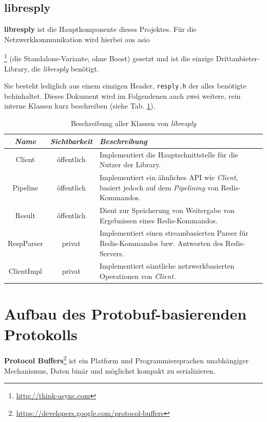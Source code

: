 \documentclass[a4paper,ngerman]{article}
\begin{document}
\subsection{libresply}
\textbf{libresply} ist die Hauptkomponente dieses Projektes.
Für die Netzwerkkommunikation wird hierbei aus asio{\footnote{\url{http://think-async.com}} (die Standalone-Variante, ohne Boost) gesetzt und ist die einzige Drittanbieter-Library, die \textit{libresply} benötigt.

Sie besteht lediglich aus einem einzigen Header, \texttt{resply.h} der alles benötigte behinhaltet.
Dieses Dokument wird im Folgendenen auch zwei weitere, rein interne Klassen kurz beschreiben (siehe Tab. \ref{tab:libresply-classes}).

\begin{table}[H]
\centering
\begin{tabularx}{\linewidth}{|c|c|X|} \hline
        \textit{Name} & \textit{Sichtbarkeit} & \textit{Beschreibung} \\\hline
        Client & öffentlich & Implementiert die Hauptschnittstelle für die Nutzer der Library. \\\hline
        Pipeline & öffentlich & Implementiert ein ähnliches API wie \textit{Client}, basiert jedoch auf dem \textit{Pipelining} von Redis-Kommandos. \\\hline
        Result & öffentlich & Dient zur Speicherung von Weitergabe von Ergebnissen eines Redis-Kommandos. \\\hline
        RespParser & privat & Implementiert einen streambasierten Parser für Redis-Kommandos bzw. Antworten des Redis-Servers. \\\hline
        ClientImpl & privat & Implementiert sämtliche netzwerkbasierten Operationen von \textit{Client}. \\\hline
\end{tabularx}
\caption{Beschreibung aller Klassen von \textit{libresply}}
\label{tab:libresply-classes}
\end{table}


\section{Aufbau des Protobuf-basierenden Protokolls}
\label{sec:protobuf-message-structure}
\textbf{Protocol Buffers}\footnote{\url{https://developers.google.com/protocol-buffers}} ist ein Platform und Programmiersprachen unabhängiger Mechanismus, Daten binär und möglichst kompakt zu serializieren.

}
\end{document}

